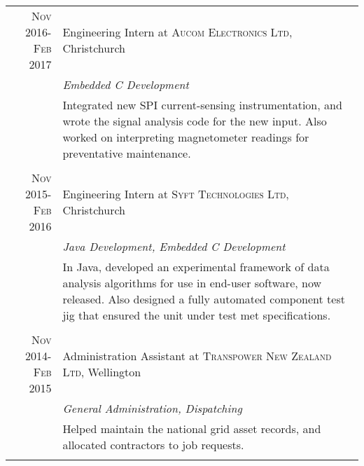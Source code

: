 \documentclass[a4paper,10pt]{article} %
\begin{document}
\begin{tabular}{r|p{11cm}}

\textsc{Nov 2016-Feb 2017} & Engineering Intern at \textsc{Aucom Electronics Ltd}, Christchurch \\
& \emph{Embedded C Development}\\
& \footnotesize{Integrated new SPI current-sensing instrumentation, and wrote the signal analysis code for the new input. Also worked on interpreting magnetometer readings for preventative maintenance. } \\
\multicolumn{2}{c}{} \\


\textsc{Nov 2015-Feb 2016} & Engineering Intern at \textsc{Syft Technologies Ltd}, Christchurch \\
& \emph{Java Development, Embedded C Development}\\
& \footnotesize{In Java, developed an experimental framework of data analysis algorithms for use in end-user software, now released. Also designed a fully automated component test jig that ensured the unit under test met specifications. } \\
\multicolumn{2}{c}{} \\




\textsc{Nov 2014-Feb 2015} & Administration Assistant at \textsc{Transpower New Zealand Ltd}, Wellington \\
& \emph{General Administration, Dispatching}\\
& \footnotesize{Helped maintain the national grid asset records, and allocated contractors to job requests. } \\
\multicolumn{2}{c}{} \\




\end{tabular}
\end{document}
